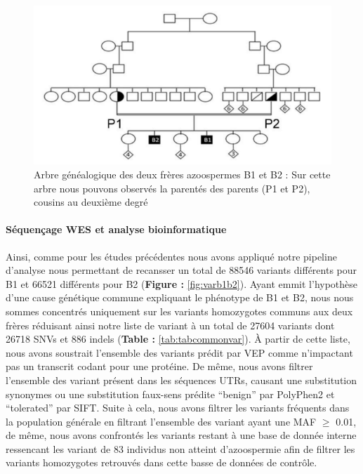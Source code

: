 \documentclass[12pt,twoside]{reedthesis}
\theoremstyle{definition}
\theoremstyle{definition}
\theoremstyle{remark}
\begin{document}
  \begin{figure}
  
  {\centering \includegraphics[scale=0.75]{figure/spink2_arbre_genealogique} 
  
  }
  
  \caption[Arbre généalogique des deux frères azoospermes B1 et B2]{Arbre généalogique des deux frères azoospermes B1 et B2 : Sur cette arbre nous pouvons observés la parentés des parents (P1 et P2), cousins au deuxième degré}\label{fig:spink2tree}
  \end{figure}
  
  \paragraph{Séquençage WES et analyse
  bioinformatique}\label{sequencage-wes-et-analyse-bioinformatique}
  
  Ainsi, comme pour les études précédentes nous avons appliqué notre
  pipeline d'analyse nous permettant de recansser un total de 88546
  variants différents pour B1 et 66521 différents pour B2 (\textbf{Figure
  : }\ref{fig:varb1b2}). Ayant emmit l'hypothèse d'une cause génétique
  commune expliquant le phénotype de B1 et B2, nous nous sommes concentrés
  uniquement sur les variants homozygotes communs aux deux frères
  réduisant ainsi notre liste de variant à un total de 27604 variants dont
  26718 SNVs et 886 indels (\textbf{Table : }\ref{tab:tabcommonvar}). À
  partir de cette liste, nous avons soustrait l'ensemble des variants
  prédit par VEP comme n'impactant pas un transcrit codant pour une
  protéine. De même, nous avons filtrer l'ensemble des variant présent
  dans les séquences UTRs, causant une substitution synonymes ou une
  substitution faux-sens prédite ``benign'' par PolyPhen2 et ``tolerated''
  par SIFT. Suite à cela, nous avons filtrer les variants fréquents dans
  la population générale en filtrant l'ensemble des variant ayant une MAF
  \(\ge\) 0.01, de même, nous avons confrontés les variants restant à une
  base de donnée interne ressencant les variant de 83 individus non
  atteint d'azoospermie afin de filtrer les variants homozygotes retrouvés
  dans cette basse de données de contrôle.
  
\end{document}
